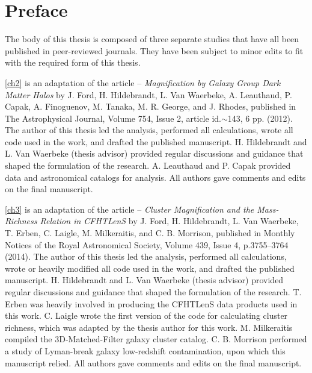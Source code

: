
\chapter{Preface}
\label{preface}

The body of this thesis is composed of three separate studies that have all been published in peer-reviewed journals. They have been subject to minor edits to fit with the required form of this thesis. 

\autoref{ch2} is an adaptation of the article -- {\it Magnification by Galaxy Group Dark Matter Halos} by J. Ford, H. Hildebrandt, L. Van Waerbeke, A. Leauthaud, P. Capak, A. Finoguenov, M. Tanaka, M. R. George, and J. Rhodes, published in The Astrophysical Journal, Volume 754, Issue 2, article id.$\sim$143, 6 pp. (2012). The author of this thesis led the analysis, performed all calculations, wrote all code used in the work, and drafted the published manuscript. H. Hildebrandt and L. Van Waerbeke (thesis advisor) provided regular discussions and guidance that shaped the formulation of the research. A. Leauthaud and P. Capak provided data and astronomical catalogs for analysis. All authors gave comments and edits on the final manuscript.

\autoref{ch3} is an adaptation of the article -- {\it Cluster Magnification and the Mass-Richness Relation in CFHTLenS} by J. Ford, H. Hildebrandt, L. Van Waerbeke, T. Erben, C. Laigle, M. Milkeraitis, and C. B. Morrison, published in Monthly Notices of the Royal Astronomical Society, Volume 439, Issue 4, p.3755--3764 (2014). The author of this thesis led the analysis, performed all calculations, wrote or heavily modified all code used in the work, and drafted the published manuscript. H. Hildebrandt and L. Van Waerbeke (thesis advisor) provided regular discussions and guidance that shaped the formulation of the research. T. Erben was heavily involved in producing the \acs{CFHTLenS} data products used in this work. C. Laigle wrote the first version of the code for calculating cluster richness, which was adapted by the thesis author for this work. M. Milkeraitis compiled the 3D-Matched-Filter galaxy cluster catalog. C. B. Morrison performed a study of Lyman-break galaxy low-redshift contamination, upon which this manuscript relied. All authors gave comments and edits on the final manuscript.


